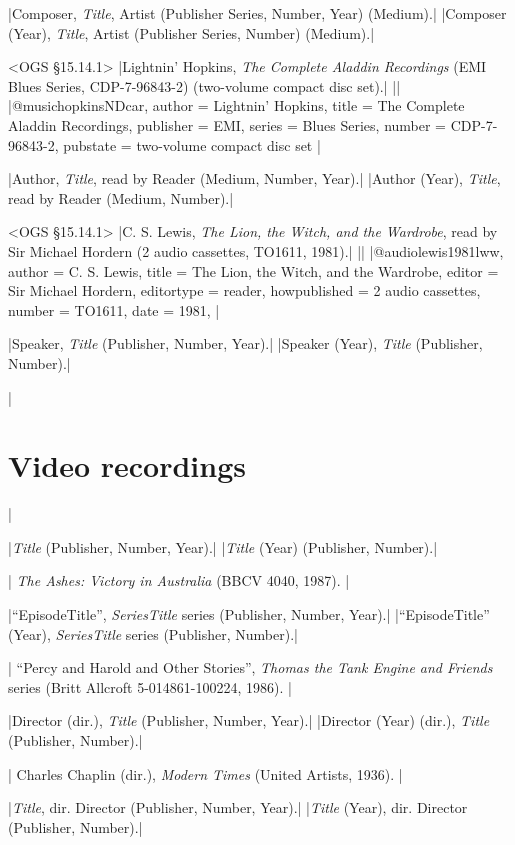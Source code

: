 \documentclass[extrafontsizes,11pt,a4paper,oneside]{memoir}
\newcommand*{\lit}[1]{\textsf{#1}}
\begin{document}
\specs
|Composer, \emph{Title}, Artist (Publisher Series, Number, Year) (Medium).|%
|Composer (Year), \emph{Title}, Artist (Publisher Series, Number) (Medium).|

\bibexample<OGS \S15.14.1>
|Lightnin' Hopkins, \emph{The Complete Aladdin Recordings} (EMI Blues Series, CDP-7-96843-2) (two-volume compact disc set).|%
||%
|@music{hopkinsNDcar,
  author = {Lightnin’ Hopkins},
  title = {The Complete Aladdin Recordings},
  publisher = {EMI},
  series = {Blues Series},
  number = {CDP-7-96843-2},
  pubstate = {two-volume compact disc set}
}|

\specs
|Author, \emph{Title}, \lit{read by} Reader (Medium, Number, Year).|%
|Author (Year), \emph{Title}, \lit{read by} Reader (Medium, Number).|

\bibexample<OGS \S15.14.1>
|C. S. Lewis, \emph{The Lion, the Witch, and the Wardrobe}, read by Sir Michael Hordern (2 audio cassettes, TO1611, 1981).|%
||%
|@audio{lewis1981lww,
  author = {C. S. Lewis},
  title = {The Lion, the Witch, and the Wardrobe},
  editor = {Sir Michael Hordern},
  editortype = {reader},
  howpublished = {2 audio cassettes},
  number = {TO1611},
  date = {1981},
}|

\specs
|Speaker, \emph{Title} (Publisher, Number, Year).|%
|Speaker (Year), \emph{Title} (Publisher, Number).|

\todoc|
\section{Video recordings}
|

\specs
|\emph{Title} (Publisher, Number, Year).|%
|\emph{Title} (Year) (Publisher, Number).|

\todoc|
\emph{The Ashes: Victory in Australia} (BBCV 4040, 1987).
|

\specs
|\enquote{EpisodeTitle}, \emph{SeriesTitle} \lit{series} (Publisher, Number, Year).|%
|\enquote{EpisodeTitle} (Year), \emph{SeriesTitle} \lit{series} (Publisher, Number).|

\todoc|
\enquote{Percy and Harold and Other Stories}, \emph{Thomas the Tank Engine and Friends} series (Britt Allcroft 5-014861-100224, 1986).
|

\specs
|Director (\lit{dir.}), \emph{Title} (Publisher, Number, Year).|%
|Director (Year) (\lit{dir.}), \emph{Title} (Publisher, Number).|

\todoc|
Charles Chaplin (dir.), \emph{Modern Times} (United Artists, 1936).
|

\specs
|\emph{Title}, \lit{dir.} Director (Publisher, Number, Year).|%
|\emph{Title} (Year), \lit{dir.} Director (Publisher, Number).|
\end{document}
